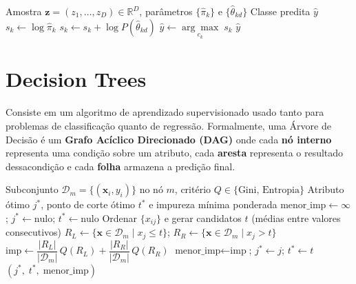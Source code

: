 \documentclass[12pt, a4paper]{article}
\theoremstyle{definition}
\theoremstyle{plain}
\theoremstyle{remark}
\begin{document}
\begin{algorithm}[H]
  \caption{NaiveBayes-Predição}
  \begin{algorithmic}[1]
    \Require Amostra $\mathbf{z} = (z_1, \ldots, z_D) \in \mathbb{R}^{D}$,
             parâmetros $\{\hat{\pi}_k\}$ e $\{\hat{\theta}_{kd}\}$
    \Ensure  Classe predita $\hat{y}$
      \State $s_k \gets \log \hat{\pi}_k$
        \State $s_k \gets s_k + \log P(\hat{\theta}_{kd})$
      \EndFor
    \EndFor
    \State $\hat{y} \gets \underset{c_k}{\arg\max}\; s_k$
    \State \Return $\hat{y}$
  \end{algorithmic}
\end{algorithm}

\section{Decision Trees}

Consiste em um algoritmo de aprendizado supervisionado usado tanto para problemas de classificação quanto de regressão. 
Formalmente, uma Árvore de Decisão é um \textbf{Grafo Acíclico Direcionado (DAG)} onde cada \textbf{nó interno} 
representa uma condição sobre um atributo, cada \textbf{aresta} representa o resultado dessacondição e cada 
\textbf{folha} armazena a predição final.

\begin{algorithm}[H]
  \caption{ClassTree-MelhorDivisão}
  \begin{algorithmic}[1]
    \Require Subconjunto $\mathcal{D}_m = \{(\mathbf{x}_i, y_i)\}$ no nó $m$,
             critério $Q \in \{\text{Gini},\, \text{Entropia}\}$
    \Ensure  Atributo ótimo $j^*$, ponto de corte ótimo $t^*$ e impureza mínima ponderada
    \State $\text{menor\_imp} \gets \infty$;\; $j^* \gets \text{nulo}$;\; $t^* \gets \text{nulo}$
      \State Ordenar $\{x_{ij}\}$ e gerar candidatos $t$ (médias entre valores consecutivos)
        \State $R_L \gets \{\mathbf{x} \in \mathcal{D}_m \mid x_{j} \leq t\}$;\;
               $R_R \gets \{\mathbf{x} \in \mathcal{D}_m \mid x_{j} > t\}$
        \State $\text{imp} \gets
               \dfrac{|R_L|}{|\mathcal{D}_m|}\,Q(R_L) +
               \dfrac{|R_R|}{|\mathcal{D}_m|}\,Q(R_R)$
          \State $\text{menor\_imp} \gets \text{imp}$;\; $j^* \gets j$;\; $t^* \gets t$
        \EndIf
      \EndFor
    \EndFor
    \State \Return $(j^*,\; t^*,\; \text{menor\_imp})$
  \end{algorithmic}
\end{algorithm}
\end{document}
